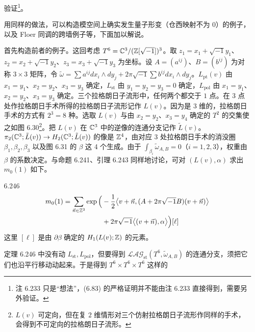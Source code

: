 验证\footnote{注 6.233 只是“想法”，(6.83) 的严格证明并不能由注 6.233 直接得到，需要另外验证。}。


用同样的做法，可以构造模空间上确实发生量子形变（仓西映射不为 $0$）的例子，以及 Floer 同调的跨墙例子等，下面加以解说。

首先构造前者的例子。这回考虑 $T^6=\mathbb{C}^3/(\mathbb{Z}[\sqrt{-1}])^3$。取 $z_1=x_1+\sqrt{-1}y_1$、$z_2=x_2+\sqrt{-1}y_2$、$z_3=x_3+\sqrt{-1}y_3$ 为坐标。设 $A=(a^{ij})$、$B=(b^{ij})$ 为对称 $3\times3$ 矩阵，令 $\tilde\omega=\sum a^{ij}dx_i\wedge dy_j+2\pi\sqrt{-1}\sum b^{ij}dx_i\wedge dy_j$。$L_{\mathrm{pt}}(v)$ 由 $x_1=y_1$、$x_2=y_2$、$x_3=y_3$ 确定，$L_{\mathrm{st}}$ 由 $y_1=y_2=y_3=0$ 确定，$L_{\mathrm{pol}}$ 由 $x_1=y_1$、$x_2=y_2$、$x_3=y_3$ 确定。三个拉格朗日子流形中，任何两个都交于 $1$ 点。在 3 点处作拉格朗日手术所得的拉格朗日子流形记作 $L(v)$。因为是 $3$ 维的，拉格朗日手术的方式有 $2^3=8$ 种。选取 $L(v)$ 与由 $x_2=y_2$、$x_3=y_4$ 确定的 $T^2$ 的交集使之如图 6.30\footnote{$L(v)$ 可定向，但在复 $2$ 维情形对三个仿射拉格朗日子流形作同样的手术，会得到不可定向的拉格朗日子流形。}。把 $L(v)$ 在 $\mathbb{C}^3$ 中的逆像的连通分支记作 $\tilde L(v)$。$\pi_2(\mathbb{C}^3;\tilde L(v))\to H_2(\mathbb{C}^3;\tilde L(v))$ 的像是 $\mathbb{Z}^4$，由对应 3 处拉格朗日手术的消没圈 $\beta_1,\beta_2,\beta_3$ 以及图 6.31 的 $\beta$ 这 4 个生成。由于 $\int_{\beta_i}\tilde\omega_{A,B}=0$（$i=1,2,3$），权重由 $\beta$ 的系数决定。与命题 6.241、引理 6.243 同样地讨论，可对 $(L(v),\alpha)$ 求出 $m_0(1)$ 如下。

\begin{theorem}{6.246}
  \[
  \begin{aligned}
    m_0(1)=\sum_{\vec n\in\mathbb{Z}^3}\exp\Big(&-\frac12\big\langle v+\vec n,(A+2\pi\sqrt{-1}B)(v+\vec n)\big\rangle\\
    &+2\pi\sqrt{-1}\big\langle(v+\vec n),\alpha\big\rangle\Big)[\ell]
  \end{aligned}
  \]
  这里 $[\ell]$ 是由 $\partial\beta$ 确定的 $H_1(L(v);\mathbb{Z})$ 的元素。
\end{theorem}

定理 6.246 中没有动 $L_{\mathrm{st}},L_{\mathrm{pol}}$，但要得到 $\mathcal{LAG}_{\mathrm{st}}(T^6,\tilde\omega_{A,B})$ 的连通分支，须把它们也沿平行移动动起来。于是得到 $T^6\times T^6\times T^6$ 这样的

